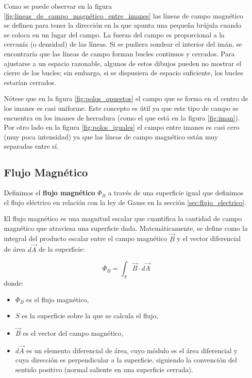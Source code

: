 Como se puede observar en la figura \ref{fig:lineas_de_campo_magnético_entre_imanes} las líneas de campo magnético se definen para tener la dirección en la que apunta una pequeña brújula cuando se coloca en un lugar del campo. La fuerza del campo es proporcional a la cercanía (o densidad) de las líneas. Si se pudiera sondear el interior del imán, se encontraría que las líneas de campo forman bucles continuos y cerrados. Para ajustarse a un espacio razonable, algunos de estos dibujos pueden no mostrar el cierre de los bucles; sin embargo, si se dispusiera de espacio suficiente, los bucles estarían cerrados. 

Nótese que en la figura \ref{fig:polos_opuestos} el campo que se forma en el centro de los imanes es casi uniforme. Este concepto es útil ya que este tipo de campo se encuentra en los imanes de herradura (como el que está en la figura \ref{fig:iman}). Por otro lado en la figura \ref{fig:polos_iguales} el campo entre imanes es casi cero (muy poca intensidad) ya que las líneas de campo magnético están muy separadas entre sí.

\subsection{Flujo Magnético}
\label{sec:flujo_magnético}

Definimos el \textbf{flujo magnético} \(\Phi_B\) a través de una superficie igual que definimos el flujo eléctrico en relación con la ley de Gauss en la sección \ref{sec:flujo_electrico}. 

El flujo magnético es una magnitud escalar que cuantifica la cantidad de campo magnético que atraviesa una superficie dada. Matemáticamente, se define como la integral del producto escalar entre el campo magnético \(\vec{B}\) y el vector diferencial de área \(d\vec{A}\) de la superficie:

\[
\Phi_B = \int_S \vec{B} \cdot d\vec{A}
\]
donde:
\begin{itemize}
  \item \(\Phi_B\) es el flujo magnético,
  \item \(S\) es la superficie sobre la que se calcula el flujo,
  \item \(\vec{B}\) es el vector del campo magnético,
  \item \(d\vec{A}\) es un elemento diferencial de área, cuyo módulo es el área diferencial y cuya dirección es perpendicular a la superficie, siguiendo la convención del sentido positivo (normal saliente en una superficie cerrada).
\end{itemize}

